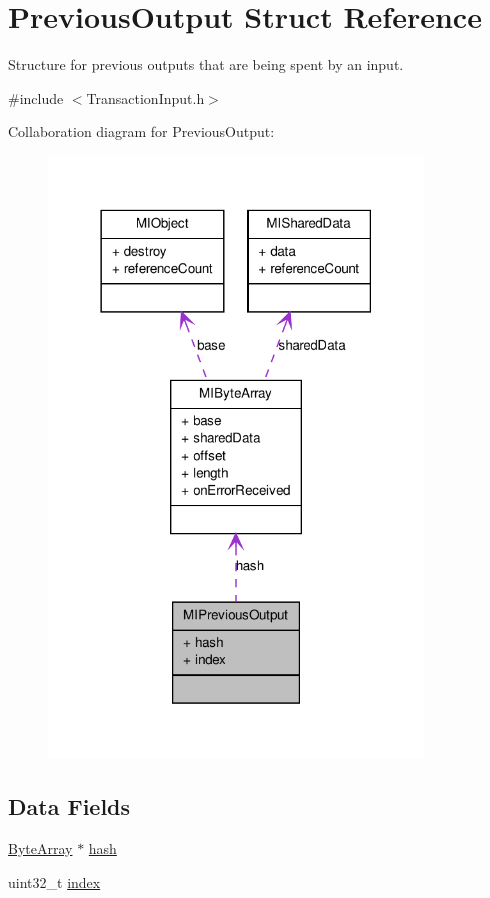 \hypertarget{struct_m_i_previous_output}{
\section{PreviousOutput Struct Reference}
\label{struct_m_i_previous_output}
}


Structure for previous outputs that are being spent by an input.  




{\ttfamily \#include $<$TransactionInput.h$>$}



Collaboration diagram for PreviousOutput:
\nopagebreak
\begin{figure}[H]
\begin{center}
\leavevmode
\includegraphics[width=282pt]{struct_m_i_previous_output__coll__graph}
\end{center}
\end{figure}
\subsection*{Data Fields}
\begin{DoxyCompactItemize}
\item 
\hyperlink{struct_m_i_byte_array}{ByteArray} $\ast$ \hyperlink{struct_m_i_previous_output_a0a38e6cfdba79d307f90c5cd5e7425df}{hash}
\item 
uint32\_\-t \hyperlink{struct_m_i_previous_output_aafd95f8c7a99b9189ede7cdf0871ebe8}{index}
\end{DoxyCompactItemize}


